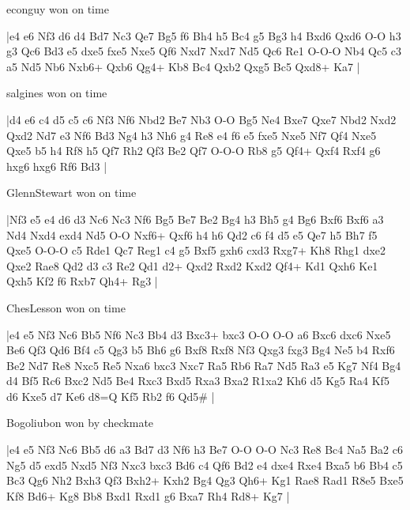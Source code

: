 \showboard

econguy won on time

\makegametitle
|e4 e6 Nf3 d6 d4 Bd7 Nc3 Qe7 Bg5 f6 Bh4 h5 Bc4 g5 Bg3 h4 Bxd6 Qxd6 O-O h3 g3 Qc6 Bd3 e5 dxe5 fxe5 Nxe5 Qf6 Nxd7 Nxd7 Nd5 Qc6 Re1 O-O-O Nb4 Qc5 c3 a5 Nd5 Nb6 Nxb6+ Qxb6 Qg4+ Kb8 Bc4 Qxb2 Qxg5 Bc5 Qxd8+ Ka7  |

\showboard

salgines won on time

\makegametitle
|d4 e6 c4 d5 c5 c6 Nf3 Nf6 Nbd2 Be7 Nb3 O-O Bg5 Ne4 Bxe7 Qxe7 Nbd2 Nxd2 Qxd2 Nd7 e3 Nf6 Bd3 Ng4 h3 Nh6 g4 Re8 e4 f6 e5 fxe5 Nxe5 Nf7 Qf4 Nxe5 Qxe5 b5 h4 Rf8 h5 Qf7 Rh2 Qf3 Be2 Qf7 O-O-O Rb8 g5 Qf4+ Qxf4 Rxf4 g6 hxg6 hxg6 Rf6 Bd3  |

\showboard

GlennStewart won on time

\makegametitle
|Nf3 e5 e4 d6 d3 Nc6 Nc3 Nf6 Bg5 Be7 Be2 Bg4 h3 Bh5 g4 Bg6 Bxf6 Bxf6 a3 Nd4 Nxd4 exd4 Nd5 O-O Nxf6+ Qxf6 h4 h6 Qd2 c6 f4 d5 e5 Qe7 h5 Bh7 f5 Qxe5 O-O-O c5 Rde1 Qc7 Reg1 c4 g5 Bxf5 gxh6 cxd3 Rxg7+ Kh8 Rhg1 dxe2 Qxe2 Rae8 Qd2 d3 c3 Re2 Qd1 d2+ Qxd2 Rxd2 Kxd2 Qf4+ Kd1 Qxh6 Ke1 Qxh5 Kf2 f6 Rxb7 Qh4+ Rg3  |

\showboard

ChesLesson won on time

\makegametitle
|e4 e5 Nf3 Nc6 Bb5 Nf6 Nc3 Bb4 d3 Bxc3+ bxc3 O-O O-O a6 Bxc6 dxc6 Nxe5 Be6 Qf3 Qd6 Bf4 c5 Qg3 b5 Bh6 g6 Bxf8 Rxf8 Nf3 Qxg3 fxg3 Bg4 Ne5 b4 Rxf6 Be2 Nd7 Re8 Nxc5 Re5 Nxa6 bxc3 Nxc7 Ra5 Rb6 Ra7 Nd5 Ra3 e5 Kg7 Nf4 Bg4 d4 Bf5 Rc6 Bxc2 Nd5 Be4 Rxc3 Bxd5 Rxa3 Bxa2 R1xa2 Kh6 d5 Kg5 Ra4 Kf5 d6 Kxe5 d7 Ke6 d8=Q Kf5 Rb2 f6 Qd5\#  |

\showboard

Bogoliubon won by checkmate

\makegametitle
|e4 e5 Nf3 Nc6 Bb5 d6 a3 Bd7 d3 Nf6 h3 Be7 O-O O-O Nc3 Re8 Bc4 Na5 Ba2 c6 Ng5 d5 exd5 Nxd5 Nf3 Nxc3 bxc3 Bd6 c4 Qf6 Bd2 e4 dxe4 Rxe4 Bxa5 b6 Bb4 c5 Bc3 Qg6 Nh2 Bxh3 Qf3 Bxh2+ Kxh2 Bg4 Qg3 Qh6+ Kg1 Rae8 Rad1 R8e5 Bxe5 Kf8 Bd6+ Kg8 Bb8 Bxd1 Rxd1 g6 Bxa7 Rh4 Rd8+ Kg7  |

